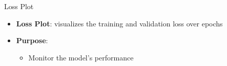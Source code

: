 \begin{frame}{Loss Plot}
    \begin{center}
        \begin{itemize}
            \item \textbf{Loss Plot}: visualizes the training and validation loss over epochs
            \item \textbf{Purpose}:
                  \begin{itemize}
                      \item Monitor the model's performance
                  \end{itemize}
        \end{itemize}
    \end{center}
\end{frame}
